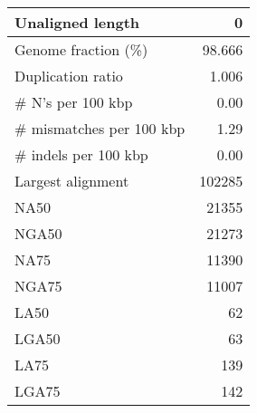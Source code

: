 \documentclass[12pt,a4paper]{article}
\begin{document}
\begin{table}[ht]
\begin{center}
\begin{tabular}{|l*{1}{|r}|}
Unaligned length & 0 \\ \hline
Genome fraction (\%) & 98.666 \\ \hline
Duplication ratio & 1.006 \\ \hline
\# N's per 100 kbp & 0.00 \\ \hline
\# mismatches per 100 kbp & 1.29 \\ \hline
\# indels per 100 kbp & 0.00 \\ \hline
Largest alignment & 102285 \\ \hline
NA50 & 21355 \\ \hline
NGA50 & 21273 \\ \hline
NA75 & 11390 \\ \hline
NGA75 & 11007 \\ \hline
LA50 & 62 \\ \hline
LGA50 & 63 \\ \hline
LA75 & 139 \\ \hline
LGA75 & 142 \\ \hline
\end{tabular}
\end{center}
\end{table}
\end{document}
